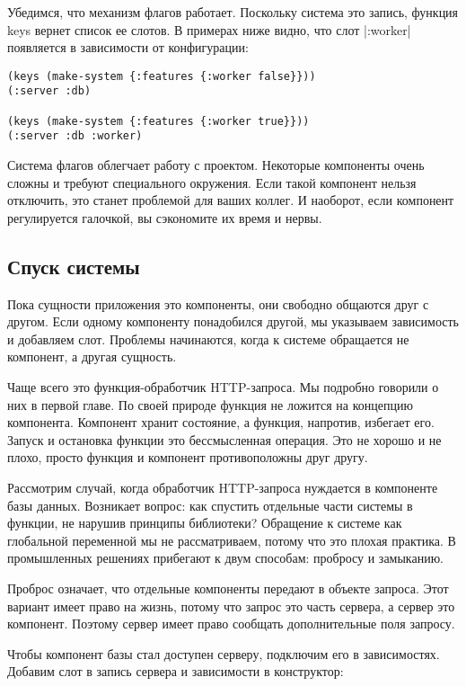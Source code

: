 Убедимся, что механизм флагов работает. Поскольку система это запись, функция
keys вернет список ее слотов. В примерах ниже видно, что слот \spverb|:worker|
появляется в зависимости от конфигурации:

\begin{verbatim}
(keys (make-system {:features {:worker false}}))
(:server :db)

(keys (make-system {:features {:worker true}}))
(:server :db :worker)
\end{verbatim}

Система флагов облегчает работу с проектом. Некоторые компоненты очень сложны и
требуют специального окружения. Если такой компонент нельзя отключить, это
станет проблемой для ваших коллег. И наоборот, если компонент регулируется
галочкой, вы сэкономите их время и нервы.

\subsection{Спуск системы}

Пока сущности приложения это компоненты, они свободно общаются друг с
другом. Если одному компоненту понадобился другой, мы указываем зависимость и
добавляем слот. Проблемы начинаются, когда к системе обращается не компонент, а
другая сущность.

Чаще всего это функция-обработчик HTTP-запроса. Мы подробно говорили о них в
первой главе. По своей природе функция не ложится на концепцию
компонента. Компонент хранит состояние, а функция, напротив, избегает
его. Запуск и остановка функции это бессмысленная операция. Это не хорошо и не
плохо, просто функция и компонент противоположны друг другу.

Рассмотрим случай, когда обработчик HTTP-запроса нуждается в компоненте базы
данных. Возникает вопрос: как спустить отдельные части системы в функции, не
нарушив принципы библиотеки? Обращение к системе как глобальной переменной мы не
рассматриваем, потому что это плохая практика. В промышленных решениях прибегают
к двум способам: пробросу и замыканию.

Проброс означает, что отдельные компоненты передают в объекте запроса. Этот
вариант имеет право на жизнь, потому что запрос это часть сервера, а сервер это
компонент. Поэтому сервер имеет право сообщать дополнительные поля запросу.

Чтобы компонент базы стал доступен серверу, подключим его в
зависимостях. Добавим слот в запись сервера и зависимости в конструктор:

